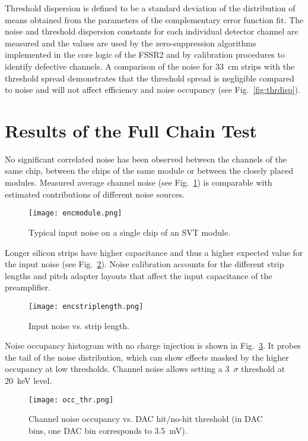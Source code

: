 Threshold dispersion is defined to be a standard deviation of the distribution of means obtained from the parameters of the complementary error function fit. The noise and threshold dispersion constants for each individual detector channel are measured and the values are used by the zero-suppression algorithms implemented in the core logic of the FSSR2 and by calibration procedures to identify defective channels. A comparison of the noise for 33~cm strips with the threshold spread demonstrates that the threshold spread is negligible compared to noise and will not affect efficiency and noise occupancy (see Fig.~\ref{fig:thrdisp}).

\section{Results of the Full Chain Test}

No significant correlated noise has been observed between the channels of the same chip, between the chips of the same module or between the closely placed modules. Measured average channel noise (see Fig.~\ref{fig:encmodule}) is comparable with estimated contributions of different noise sources. 

\begin{figure}[hbt] 
\centering 
\texttt{[image: encmodule.png]}
\caption{Typical input noise on a single chip of an SVT module.}
\label{fig:encmodule}
\end{figure}

Longer silicon strips have higher capacitance and thus a higher expected value for the input noise (see Fig.~\ref{fig:encstriplength}). Noise calibration accounts for the different strip lengths and pitch adapter layouts that affect the input capacitance of the preamplifier. 

\begin{figure}[hbt] 
\centering 
\texttt{[image: encstriplength.png]}
\caption{Input noise vs. strip length.}
\label{fig:encstriplength}
\end{figure}

Noise occupancy histogram with no charge injection is shown in Fig.~\ref{fig:noiseocc}. It probes the tail of the noise distribution, which can show effects masked by the higher occupancy at low thresholds. Channel noise allows setting a 3~$\sigma$ threshold at 20~keV level. 

\begin{figure}[hbt] 
\centering 
\texttt{[image: occ\_thr.png]}
\caption{Channel noise occupancy vs. DAC hit/no-hit threshold (in DAC bins, one DAC bin corresponds to 3.5~mV).}
\label{fig:noiseocc}
\end{figure}


